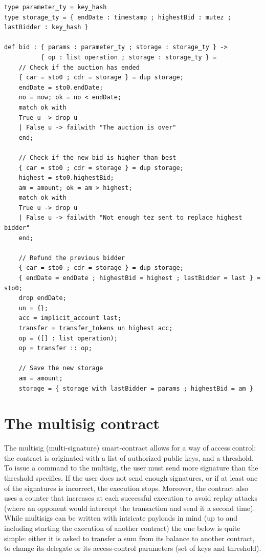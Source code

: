 \documentclass{report}
\begin{document}
\begin{lstlisting}
type parameter_ty = key_hash
type storage_ty = { endDate : timestamp ; highestBid : mutez ; lastBidder : key_hash }

def bid : { params : parameter_ty ; storage : storage_ty } ->
          { op : list operation ; storage : storage_ty } =
    // Check if the auction has ended
    { car = sto0 ; cdr = storage } = dup storage;
    endDate = sto0.endDate;
    no = now; ok = no < endDate;
    match ok with
    True u -> drop u
    | False u -> failwith "The auction is over"
    end;

    // Check if the new bid is higher than best
    { car = sto0 ; cdr = storage } = dup storage;
    highest = sto0.highestBid;
    am = amount; ok = am > highest;
    match ok with
    True u -> drop u
    | False u -> failwith "Not enough tez sent to replace highest bidder"
    end;

    // Refund the previous bidder
    { car = sto0 ; cdr = storage } = dup storage;
    { endDate = endDate ; highestBid = highest ; lastBidder = last } = sto0;
    drop endDate;
    un = {};
    acc = implicit_account last;
    transfer = transfer_tokens un highest acc;
    op = ([] : list operation);
    op = transfer :: op;

    // Save the new storage
    am = amount;
    storage = { storage with lastBidder = params ; highestBid = am }
\end{lstlisting}

\section{The multisig contract}
\label{appendix:multisigAlbert}

The multisig (multi-signature) smart-contract allows for a way of access control: the contract is originated with a list of authorized public keys, and a threshold. To issue a command to the multisig, the user must send more signature than the threshold specifies. If the user does not send enough signatures, or if at least one of the signatures is incorrect, the execution stops. Moreover, the contract also uses a counter that increases at each successful execution to avoid replay attacks (where an opponent would intercept the transaction and send it a second time). While multisigs can be written with intricate payloads in mind (up to and including starting the execution of another contract) the one below is quite simple: either it is asked to transfer a sum from its balance to another contract, to change its delegate or its access-control parameters (set of keys and threshold).
\end{document}
